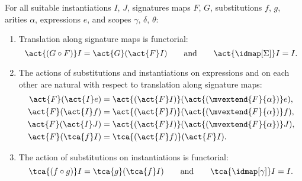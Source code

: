 \begin{propositionwithqed}
  \label{prop:instantiation-boilerplate}%
  For all suitable instantiations $I$, $J$, signatures maps $F$, $G$, substitutions $f$, $g$, arities $\alpha$, expressions $e$, and scopes $\gamma$, $\delta$, $\theta$:
  \begin{enumerate}

  \item
    Translation along signature maps is functorial:
    \begin{equation*}
       \act{(G \circ F)} I = \act{G} (\act{F} I)
      \qquad\text{and}\qquad
      \act{{\idmap[\Sigma]}} I = I.
    \end{equation*}

  \item
    The actions of substitutions and instantiations on expressions and on each other are natural with respect to translation along signature maps:
    \begin{align*}
      \act{F}(\act{I} e) & = \act{(\act{F} I)} (\act{(\mvextend{F}{\alpha})} e), \\
      \act{F}(\act{I} f) & = \act{(\act{F} I)} (\act{(\mvextend{F}{\alpha})} f), \\
      \act{F}(\act{I} J) & = \act{(\act{F} I)} (\act{(\mvextend{F}{\alpha})} J), \\
      \act{F}(\tca{f} I) & = \tca{(\act{F} f)} (\act{F} I).
    \end{align*}

  \item
    The action of substitutions on instantiations is functorial:
    \begin{equation*}
      \tca{(f \circ g)} I = \tca{g} (\tca{f} I)
      \qquad\text{and}\qquad
      \tca{{\idmap[\gamma]}} I = I.
    \end{equation*}


\end{enumerate}
\end{propositionwithqed}

